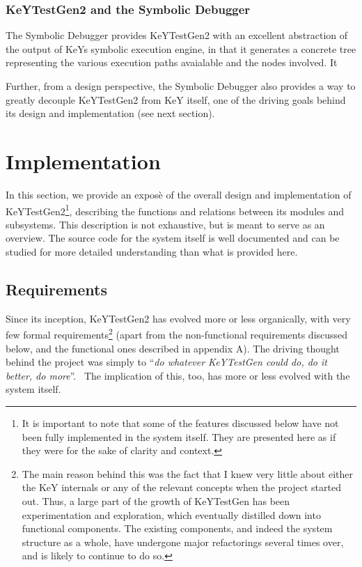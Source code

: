 \documentclass{article}
\newcommand{\tmem}[1]{{\em #1\/}}
\begin{document}
\subsubsection{KeYTestGen2 and the Symbolic Debugger}

The Symbolic Debugger provides KeYTestGen2 with an excellent abstraction of
the output of KeYs symbolic execution engine, in that it generates a concrete
tree representing the various execution paths avaialable and the nodes
involved. It



Further, from a design perspective, the Symbolic Debugger also provides a way
to greatly decouple KeYTestGen2 from KeY itself, one of the driving goals
behind its design and implementation (see next section). \

\section{Implementation}

In this section, we provide an expos{\`e} of the overall design and
implementation of KeYTestGen2{\footnote{It is important to note that some of
the features discussed below have not been fully implemented in the system
itself. They are presented here as if they were for the sake of clarity and
context.}}, describing the functions and relations between its modules and
subsystems. This description is not exhaustive, but is meant to serve as an
overview. The source code for the system itself is well documented and can be
studied for more detailed understanding than what is provided here.

\subsection{ Requirements}

Since its inception, KeYTestGen2 has evolved more or less organically, with
very few formal requirements{\footnote{The main reason behind this was the
fact that I knew very little about either the KeY internals or any of the
relevant concepts when the project started out. Thus, a large part of the
growth of KeYTestGen has been experimentation and exploration, which
eventually distilled down into functional components. The existing components,
and indeed the system structure as a whole, have undergone major refactorings
several times over, and is likely to continue to do so.}} (apart from the
non-functional requirements discussed below, and the functional ones described
in appendix A). The driving thought behind the project was simply to
``{\tmem{do whatever KeYTestGen could do, do it better, do more}}''. \ The
implication of this, too, has more or less evolved with the system itself.
\end{document}
